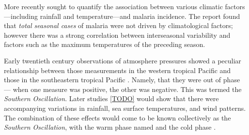 More recently \cite{craig2004} sought to quantify the association between
various climatic factors---including rainfall and temperature---and malaria
incidence. The report found that \emph{total seasonal cases} of malaria were not
driven by climatological factors; however there was a strong correlation between
interseasonal variability and factors such as the maximum temperatures of the
preceding season.




\vspace{1cm}

Early twentieth century observations of atmosphere pressures showed a peculiar
relationship between those measurements in the western tropical Pacific and
those in the southeastern tropical Pacific \citep{holton1989}. Namely, that they
were out of phase --- when one measure was positive, the other was negative.
This was termed the \emph{Southern Oscillation}. Later studies \ref{TODO} would
show that there were accompanying variations in rainfall, sea surface
temperatures, and wind patterns. The combination of these effects would come to
be known collectively as the \elnino{} \emph{Southern Oscillation}, with the
warm phase named \elnino{} and the cold phase \nina{}.



